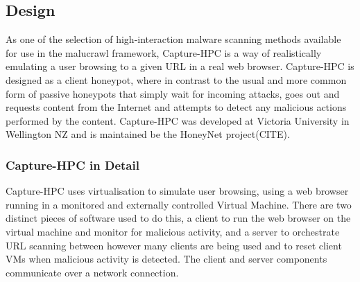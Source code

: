 \subsection{Design}

As one of the selection of high-interaction malware scanning
methods available for use in the malucrawl framework,
Capture-HPC\cite{capture-hpc} is a way of
realistically emulating a user browsing to a given URL in a real web browser.
Capture-HPC is designed as a client honeypot, where in contrast to the usual and
more common form of passive honeypots that simply wait for incoming attacks,
goes out and requests content from the Internet and attempts to detect any
malicious actions performed by the content. Capture-HPC was developed at Victoria
University in Wellington NZ and is maintained be the HoneyNet project(CITE).

\subsubsection{Capture-HPC in Detail}

Capture-HPC uses virtualisation to simulate user browsing, using a web browser
running in a monitored and externally controlled Virtual Machine. There are two
distinct pieces of software used to do this, a client to run the web browser on
the virtual machine and monitor for malicious activity, and a server to
orchestrate URL scanning between however many clients are being used and to
reset client VMs when malicious activity is detected. The client and server
components communicate over a network connection.
